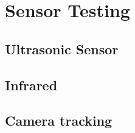\section{Sensor Testing}

\subsection{Ultrasonic Sensor}

\subsection{Infrared}

\subsection{Camera tracking}%